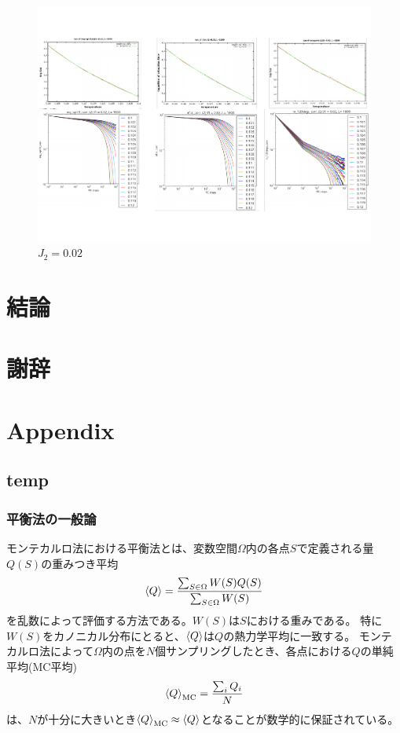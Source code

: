 \documentclass[12pt,titlepage,dvipdfmx]{jarticle}
\begin{document}
\begin{figure}[tbh]
   \centering
   \includegraphics[width=15cm]{figure/relaxation_process_J2_0.02.pdf}
   \caption{$J_2=0.02$}
\end{figure}

\newpage
\section{結論}

\newpage

\section{謝辞}

\newpage
\section{Appendix}
\subsection{temp}
\subsubsection{平衡法の一般論}
モンテカルロ法における平衡法とは、変数空間$\Omega$内の各点$S$で定義される量$Q(S)$の重みつき平均
\begin{align}
\ev{Q} = \frac{\sum_{S\in\Omega} W(S)Q(S)}{\sum_{S\in\Omega}W(S)}
\end{align}
を乱数によって評価する方法である。$W(S)$は$S$における重みである。
特に$W(S)$をカノニカル分布にとると、$\ev{Q}$は$Q$の熱力学平均に一致する。
モンテカルロ法によって$\Omega$内の点を$N$個サンプリングしたとき、各点における$Q$の単純平均(MC平均)
\begin{align}
\ev{Q}_{\mathrm{MC}} = \frac{\sum_iQ_i}{N}
\end{align}
は、$N$が十分に大きいとき$\ev{Q}_{\mathrm{MC}}\approx\ev{Q}$となることが数学的に保証されている。
\end{document}
